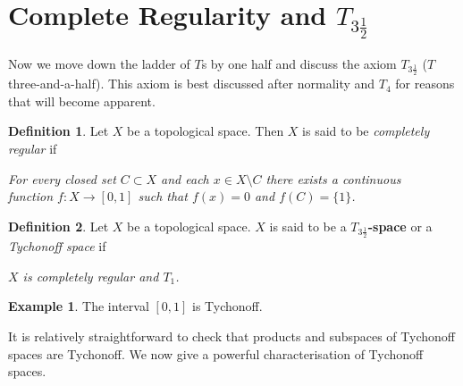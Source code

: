 \documentclass{book}
\theoremstyle{definition}
\newtheorem{definition}{Definition}[section]
\newtheorem{example}{Example}[section]
\theoremstyle{remark}
\begin{document}
\section{Complete Regularity and $T_{3\tfrac{1}{2}}$}
Now we move down the ladder of $T$s by one half and discuss the axiom $T_{3\tfrac{1}{2}}$ ($T$ three-and-a-half). This axiom is best discussed after normality and $T_4$ for reasons that will become apparent.

\begin{definition}
Let $X$ be a topological space. Then $X$ is said to be \textit{completely regular} if
\begin{center}
    \textit{For every closed set $C\subset X$ and each $x\in X\setminus C$ there exists a continuous\\ function $f:X\to[0,1]$ such that $f(x)=0$ and $f(C)=\{1\}$.}
\end{center}
\end{definition}


\begin{definition}
Let $X$ be a topological space. $X$ is said to be a \textbf{$T_{3\tfrac{1}{2}}$-space} or a \textit{Tychonoff space} if
\begin{center}
    \textit{$X$ is completely regular and $T_1$.}
\end{center}
\end{definition}

\begin{example}
The interval $[0,1]$ is Tychonoff.
\end{example}

It is relatively straightforward to check that products and subspaces of Tychonoff spaces are Tychonoff. We now give a powerful characterisation of Tychonoff spaces.
\end{document}
